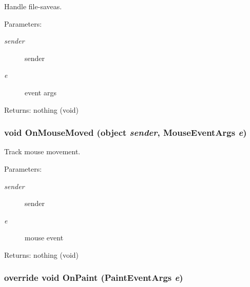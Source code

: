 Handle file-saveas. 

\begin{Desc}
\item[Parameters:]
\begin{description}
\item[{\em sender}]sender \item[{\em e}]event args \end{description}
\end{Desc}
\begin{Desc}
\item[Returns:]nothing (void) \end{Desc}
\subsubsection{\setlength{\rightskip}{0pt plus 5cm}void On\-Mouse\-Moved (object {\em sender}, Mouse\-Event\-Args {\em e})\hspace{0.3cm}{\tt  [private]}}\label{class_c_s_image_viewer_1_1_c_s_image_viewer_9f3fb3c1482b02132c8435daac3daf6a}


Track mouse movement. 

\begin{Desc}
\item[Parameters:]
\begin{description}
\item[{\em sender}]sender \item[{\em e}]mouse event \end{description}
\end{Desc}
\begin{Desc}
\item[Returns:]nothing (void) \end{Desc}
\subsubsection{\setlength{\rightskip}{0pt plus 5cm}override void On\-Paint (Paint\-Event\-Args {\em e})\hspace{0.3cm}{\tt  [protected]}}\label{class_c_s_image_viewer_1_1_c_s_image_viewer_7b49a512aef9068aebdc17097736f6b9}


